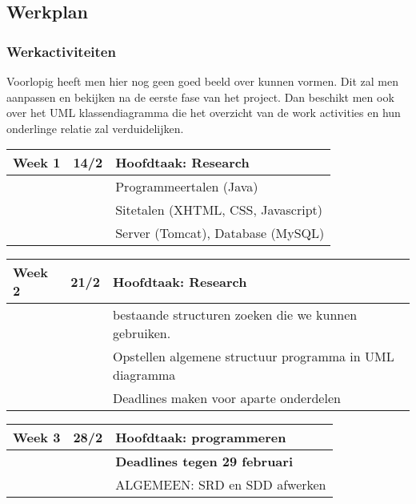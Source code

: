 \documentclass{article}
\begin{document}
\subsection{Werkplan}

\subsubsection{Werkactiviteiten}

Voorlopig heeft men hier nog geen goed beeld over kunnen vormen. Dit zal men aanpassen en bekijken na de eerste fase van het project. Dan beschikt men ook over het UML klassendiagramma die het overzicht van de work activities en hun onderlinge relatie zal verduidelijken.


\begin{center}

\begin{tabular}[t]{|p{1.3cm}|p{0.8cm}|p{9cm}|}
\hline
Week 1	& 14/2 &	\textbf{Hoofdtaak:} Research \\
\hline
 & & Programmeertalen (Java) \\
 & & Sitetalen (XHTML, CSS, Javascript) \\ 
 & & Server (Tomcat), Database (MySQL) \\
 \hline
\end{tabular}
 
 
\begin{tabular}[t]{|p{1.3cm}|p{0.8cm}|p{9cm}|}
 \hline
Week 2	& 21/2 &	\textbf{Hoofdtaak:} Research \\
\hline
 & & bestaande structuren zoeken die we kunnen gebruiken. \\
 & & Opstellen algemene structuur programma in UML diagramma \\
 & & Deadlines maken voor aparte onderdelen \\
 \hline
 \end{tabular}
 
\begin{tabular}[t]{|p{1.3cm}|p{0.8cm}|p{9cm}|}
 \hline
Week 3	& 28/2 &	\textbf{Hoofdtaak:} programmeren \\
\hline
 & & \textbf{Deadlines tegen 29 februari} \\
 & & ALGEMEEN: SRD en SDD afwerken \\
\hline
\end{tabular}



\end{center}
\end{document}
